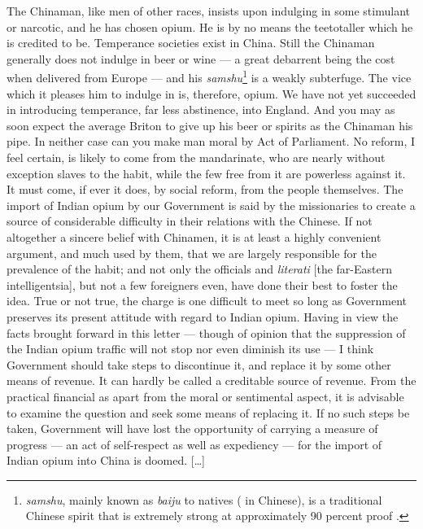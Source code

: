 \begin{fancyquote}
	[\ldots] The Chinaman, like men of other races, insists upon indulging in some stimulant or narcotic, and he has chosen opium. He is by no means the teetotaller which he is credited to be. Temperance societies exist in China. Still the Chinaman generally does not indulge in beer or wine --- a great debarrent being the cost when delivered from Europe --- and his \textit{samshu}\footnote{\textit{samshu}, mainly known as \textit{baiju} to natives ( in Chinese), is a traditional Chinese spirit that is extremely strong at approximately 90 percent proof
	\autocite{Antkiewicz:1993}.} is a weakly subterfuge. The vice which it pleases him to indulge in is, therefore, opium. We have not yet succeeded in introducing temperance, far less abstinence, into England. And you may as soon expect the average Briton to give up his beer or spirits as the Chinaman his pipe. In neither case can you make man moral by Act of Parliament. No reform, I feel certain, is likely to come from the mandarinate, who are nearly without exception slaves to the habit, while the few free from it are powerless against it. It must come, if ever it does, by social reform, from the people themselves. The import of Indian opium by our Government is said by the missionaries to create a source of considerable difficulty in their relations with the Chinese. If not altogether a sincere belief with Chinamen, it is at least a highly convenient argument, and much used by them, that we are largely responsible for the prevalence of the habit; and not only the officials and \textit{literati} [the far-Eastern intelligentsia], but not a few foreigners even, have done their best to foster the idea. True or not true, the charge is one difficult to meet so long as Government preserves its present attitude with regard to Indian opium. Having in view the facts brought forward in this letter --- though of opinion that the suppression of the Indian opium traffic will not stop nor even diminish its use --- I think Government should take steps to discontinue it, and replace it by some other means of revenue. It can hardly be called a creditable source of revenue. From the practical financial as apart from the moral or sentimental aspect, it is advisable to examine the question and seek some means of replacing it. If no such steps be taken, Government will have lost the opportunity of carrying a measure of progress --- an act of self-respect as well as expediency --- for the import of Indian opium into China is doomed. [\ldots]
	\begin{flushright}
		\autocite{SpecialCorrespondent:1884}
	\end{flushright}
\end{fancyquote}
